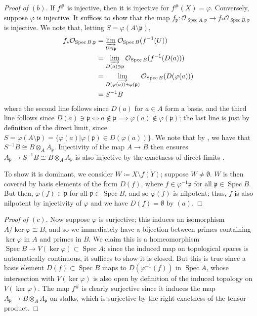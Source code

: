 \documentclass[12pt,letterpaper]{article}
\theoremstyle{definition}
\theoremstyle{remark}
\numberwithin{equation}{section}
\numberwithin{figure}{problem}
\DeclareMathOperator{\Spec}{Spec}
\newcommand{\OO}{\mathcal{O}}
\begin{document}
\begin{proof}[Proof of $(b)$]
  If $f^\#$ is injective, then it is injective for $f^\#(X) = \varphi$. Conversely, suppose $\varphi$ is injective. It suffices to show that the map $f_\mathfrak{p}\colon \OO_{\Spec A,\mathfrak{p}} \to f_*\OO_{\Spec B,\mathfrak{p}}$ is injective. We note that, letting $S = \varphi(A \setminus \mathfrak{p})$,
  \begin{align*}
    f_*\OO_{\Spec B,\mathfrak{p}} &= \varinjlim_{U \ni \mathfrak{p}} \OO_{\Spec B}(f^{-1}(U))\\
    &= \varinjlim_{D(a) \ni \mathfrak{p}} \OO_{\Spec B}(f^{-1}(D(a)))\\
    &= \varinjlim_{D(\varphi(a)) \ni \varphi(\mathfrak{p})} \OO_{\Spec B}(D(\varphi(a)))\\
    &= S^{-1}B
  \end{align*}
  where the second line follows since $D(a)$ for $a \in A$ form a basis, and the third line follows since $D(a) \ni \mathfrak{p} \iff a \notin \mathfrak{p} \implies \varphi(a) \notin \varphi(\mathfrak{p})$; the last line is just by definition of the direct limit, since $S = \varphi(A \setminus \mathfrak{p}) = \{\varphi(a) \vert \varphi(\mathfrak{p}) \in D(\varphi(a)) \}$. We note that by \cite[Prop.~3.5]{AM69}, we have that $S^{-1}B \cong B \otimes_A A_\mathfrak{p}$. Injectivity of the map $A \to B$ then ensures $A_\mathfrak{p} \to S^{-1}B \cong B \otimes_A A_\mathfrak{p}$ is also injective by the exactness of direct limits \cite[Ex.~2.19]{AM69}.
  \par To show it is dominant, we consider $W \coloneqq X \setminus \overline{f(Y)}$; suppose $W \ne \emptyset$. $W$ is then covered by basis elements of the form $D(f)$, where $f \in \varphi^{-1}\mathfrak{p}$ for all $\mathfrak{p} \in \Spec B$. But then, $\varphi(f) \in \mathfrak{p}$ for all $\mathfrak{p} \in \Spec B$, and so $\varphi(f)$ is nilpotent; thus, $f$ is also nilpotent by injectivity of $\varphi$ and we have $D(f) = \emptyset$ by $(a)$.
\end{proof}
\begin{proof}[Proof of $(c)$]
  Now suppose $\varphi$ is surjective; this induces an isomorphism $A/\ker\varphi \cong B$, and so we immediately have a bijection between primes containing $\ker\varphi$ in $A$ and primes in $B$. We claim this is a homeomorphism $\Spec B \to V(\ker\varphi) \subset \Spec A$; since the induced map on topological spaces is automatically continuous, it suffices to show it is closed. But this is true since a basis element $D(f) \subset \Spec B$ maps to $D(\varphi^{-1}(f))$ in $\Spec A$, whose intersection with $V(\ker\varphi)$ is also open by definition of the induced topology on $V(\ker\varphi)$. The map $f^\#$ is clearly surjective since it induces the map $A_\mathfrak{p} \to B \otimes_A A_\mathfrak{p}$ on stalks, which is surjective by the right exactness of the tensor product.
\end{proof}
\end{document}
